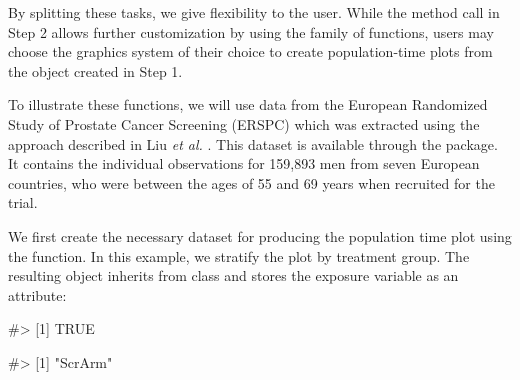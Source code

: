 By splitting these tasks, we give flexibility to the user. While the
method call in Step 2 allows further customization by using the
 \citep{ggplot2} family of functions, users may choose
the graphics system of their choice to create population-time plots from
the object created in Step 1.

To illustrate these functions, we will use data from the European
Randomized Study of Prostate Cancer Screening (ERSPC)
\citep{schroder2009screening} which was extracted using the approach
described in Liu \emph{et al.} \citeyearpar{liu2014recovering}. This
dataset is available through the  package. It contains the
individual observations for 159,893 men from seven European countries,
who were between the ages of 55 and 69 years when recruited for the
trial.

We first create the necessary dataset for producing the population time
plot using the  function. In this example, we stratify the
plot by treatment group. The resulting object inherits from class
 and stores the exposure variable as an attribute:

\begin{Schunk}
\begin{Soutput}
#> [1] TRUE
\end{Soutput}
\begin{Soutput}
#> [1] "ScrArm"
\end{Soutput}
\end{Schunk}

